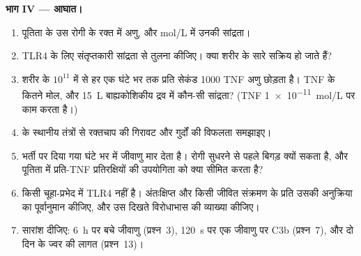 \begin{problem}
\medskip
\noindent\textbf{भाग IV --- आघात।}
\begin{enumerate}[resume]
  \item पूतिता के उस रोगी के रक्त में  अणु, और mol/L
        में उनकी सांद्रता।
  \item TLR4 के लिए संतृप्तकारी सांद्रता से तुलना कीजिए। क्या शरीर के
        सारे  सक्रिय हो जाते हैं?
  \item शरीर के $10^{11}$  में से हर एक घंटे भर तक प्रति
        सेकंड \num{1000} TNF अणु छोड़ता है। TNF के कितने मोल, और
        \qty{15}{L} बाह्यकोशिकीय द्रव में कौन-सी सांद्रता? (TNF
        \qty{1e-11}{mol/L} पर काम करता है।)
  \item {} के स्थानीय तंत्रों से रक्तचाप की गिरावट और गुर्दों की
        विफलता समझाइए।
  \item भर्ती पर दिया गया  घंटे भर में जीवाणु मार देता है।
        रोगी सुधरने से पहले बिगड़ क्यों सकता है, और पूतिता में
        प्रति-TNF प्रतिरक्षियों की उपयोगिता को क्या सीमित करता है?
  \item किसी चूहा-प्रभेद में TLR4 नहीं है। अंतःक्षिप्त
         और किसी जीवित  संक्रमण के प्रति
        उसकी अनुक्रिया का पूर्वानुमान कीजिए, और उस दिखते विरोधाभास की
        व्याख्या कीजिए।
  \item सारांश दीजिए: \qty{6}{h} पर बचे जीवाणु (प्रश्न~3),
        \qty{120}{s} पर एक जीवाणु पर C3b (प्रश्न~7), और दो दिन के
        ज्वर की लागत (प्रश्न~13)।
\end{enumerate}
\end{problem}
